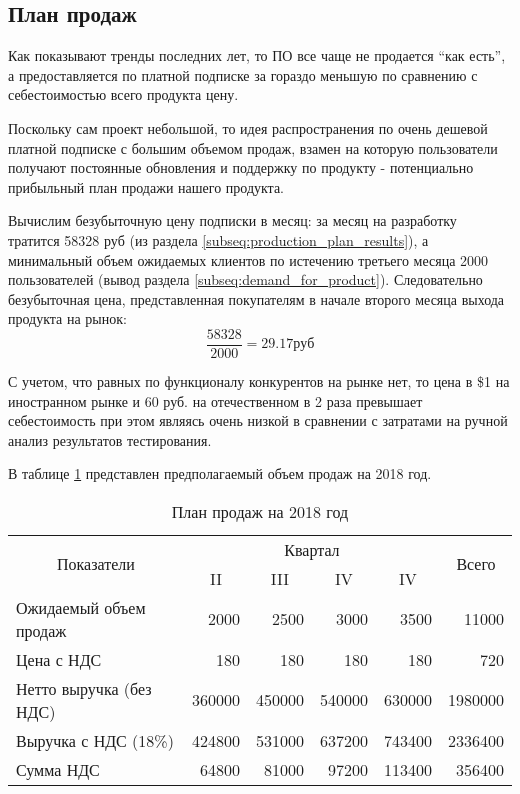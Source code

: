 \subsection{План продаж}
	Как показывают тренды последних лет, то ПО все чаще не продается \enquote{как есть}, а предоставляется по платной подписке за гораздо меньшую по сравнению с себестоимостью всего продукта цену. 
	
	Поскольку сам проект небольшой, то идея распространения по очень дешевой платной подписке с большим объемом продаж, взамен на которую пользователи получают постоянные обновления и поддержку по продукту - потенциально прибыльный план продажи нашего продукта.
	
	Вычислим безубыточную цену подписки в месяц: за месяц на разработку тратится 58328 руб (из раздела \ref{subseq:production_plan_results}), а минимальный объем ожидаемых клиентов по истечению третьего месяца 2000 пользователей (вывод раздела \ref{subseq:demand_for_product}). Следовательно безубыточная цена, представленная покупателям в начале второго месяца выхода продукта на рынок:
	\[
		\dfrac{58328}{2000} = 29.17 руб
	\]
	
	С учетом, что равных по функционалу конкурентов на рынке нет, то цена в \$1 на иностранном рынке и 60 руб. на отечественном в 2 раза превышает себестоимость при этом являясь очень низкой в сравнении с затратами на ручной анализ результатов тестирования.
	
	В таблице \ref{table:trading_plan} представлен предполагаемый объем продаж на 2018 год.
		
	\begin{table}[!h]
		\def\arraystretch{1.3}
		\centering	
		\caption{План продаж на 2018 год}
		\label{table:trading_plan}
		\begin{tabular}{|p{3cm}|r|r|r|r|r|}
			\hline
			\multicolumn{1}{|c|}{\multirow{2}{*}{Показатели}} & \multicolumn{4}{c|}{Квартал} & \multicolumn{1}{c|}{\multirow{2}{*}{Всего}} \\ \cline{2-5}
			\multicolumn{1}{|c|}{} & \multicolumn{1}{c|}{II} & \multicolumn{1}{c|}{III} & \multicolumn{1}{c|}{IV} & \multicolumn{1}{c|}{IV} & \multicolumn{1}{c|}{} \\ \hline
			Ожидаемый объем продаж & 2000 & 2500 & 3000 & 3500 & 11000 \\ \hline
			Цена с НДС & 180 & 180 & 180 & 180 & 720 \\ \hline
			Нетто выручка (без НДС) & 360000 & 450000 & 540000 & 630000 & 1980000 \\ \hline
			Выручка с НДС (18\%) & 424800 & 531000 & 637200 & 743400 & 2336400 \\ \hline
			Сумма НДС & 64800 & 81000 & 97200 & 113400 & 356400 \\ \hline
		\end{tabular}
	\end{table}
	
